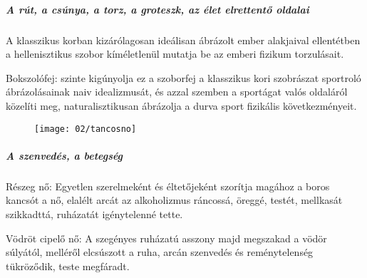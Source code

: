 	\subparagraph{A rút, a csúnya, a torz, a groteszk, az élet elrettentő oldalai}
	
	A klasszikus korban kizárólagosan ideálisan ábrázolt ember alakjaival ellentétben a hellenisztikus szobor kíméletlenül mutatja be az emberi fizikum torzulásait.
	
	Bokszolófej: szinte kigúnyolja ez a szoborfej a klasszikus kori szobrászat sportroló ábrázolásainak naiv idealizmusát, és azzal szemben a sportágat valós oldaláról közelíti meg, naturalisztikusan ábrázolja a durva sport fizikális következményeit.
	
	\begin{figure}[H]
		\begin{minipage}{0.3\textwidth}
		\end{minipage}
		\hfill
		\begin{minipage}{0.33\textwidth}
			\begin{tcolorbox}[enhanced,colframe=gray!50!white,
				colbacktitle=white!15!white,
				coltitle=gray!50!black,
				borderline={0.5mm}{0mm}{gray!15!white},
				borderline={0.5mm}{0mm}{gray!50!white,dashed},
				attach boxed title to top center={yshift=-2mm},
				boxed title style={boxrule=0.4pt},
				title=Táncosnő]{
					\texttt{[image: 02/tancosno]}
				}			
			\end{tcolorbox}
		\end{minipage}
		\hfill
		\begin{minipage}{0.3\textwidth}
		\end{minipage}	
	\end{figure}

	\subparagraph{A szenvedés, a betegség}
	
	Részeg nő: Egyetlen szerelmeként és éltetőjeként szorítja magához a boros kancsót a nő, elalélt arcát az alkoholizmus ráncossá, öreggé, testét, mellkasát szikkadttá, ruházatát igénytelenné tette.
	
	Vödröt cipelő nő: A szegényes ruházatú asszony majd megszakad a vödör súlyától, melléről elcsúszott a ruha, arcán szenvedés és reménytelenség tükröződik, teste megfáradt.
	
